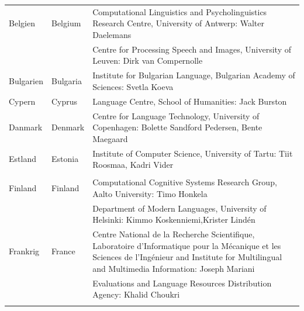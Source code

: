 \cleardoublepage

\appendix
{}



  
\cleardoublepage

\label{metanetmembers}

\small
\begin{longtable}{llp{105mm}}
  Belgien & \textcolor{grey1}{Belgium} & Computational Linguistics and Psycholinguistics Research Centre, University of Antwerp: Walter Daelemans\\ \addlinespace
  & & Centre for Processing Speech and Images, University of Leuven: Dirk van Compernolle \\ \addlinespace 
  
Bulgarien & \textcolor{grey1}{Bulgaria} & Institute for Bulgarian Language, Bulgarian Academy of Sciences: Svetla Koeva \\ \addlinespace

Cypern & \textcolor{grey1}{Cyprus} & Language Centre, School of Humanities: Jack Burston \\ \addlinespace

Danmark &  \textcolor{grey1}{Denmark} & Centre for Language Technology, University of Copenhagen: \newline Bolette Sandford Pedersen, Bente Maegaard\\ \addlinespace

  Estland & \textcolor{grey1}{Estonia} & Institute of Computer Science, University of Tartu: Tiit Roosmaa, Kadri Vider\\ \addlinespace\\ \addlinespace
  
  Finland & \textcolor{grey1}{Finland} & Computational Cognitive Systems Research Group, Aalto University: Timo Honkela\\ \addlinespace
  & & Department of Modern Languages, University of Helsinki: Kimmo Koskenniemi,\newline Krister Lindén \\ \addlinespace

  Frankrig & \textcolor{grey1}{France} & Centre National de la Recherche Scientifique, Laboratoire d'Informatique pour la Mécanique et les Sciences de l'Ingénieur and Institute for Multilingual and Multimedia Information: Joseph Mariani \\ \addlinespace
  & & Evaluations and Language Resources Distribution Agency: Khalid Choukri\\ \addlinespace
  

\end{longtable}
